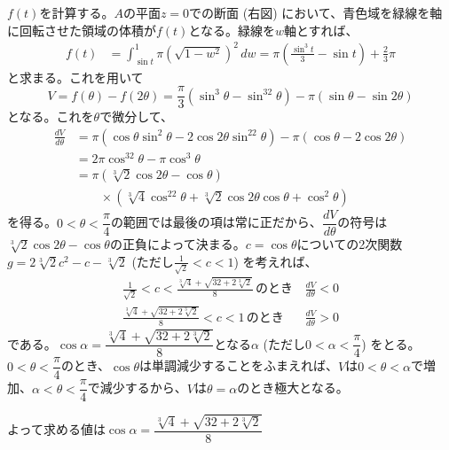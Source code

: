 $f(t)$を計算する。$A$の平面$z=0$での断面 (右図) において、青色域を緑線を軸に回転させた領域の体積が$f(t)$となる。緑線を$w$軸とすれば、
\begin{align*}
 f(t)&=\int_{\sin t}^1\! \pi \left(\sqrt{1-w^2}\right)^2 \,dw = \pi\left(\frac{\sin^3 t}{3}-\sin t\right)+\frac{2}{3}\pi
\end{align*}
と求まる。これを用いて
\[ V=f(\theta)-f(2\theta)=\frac{\pi}{3}(\sin^3\theta-\sin^32\theta)-\pi(\sin \theta-\sin 2\theta) \]
となる。これを$\theta$で微分して、
\begin{align*}
 \frac{dV}{d\theta}&=\pi(\cos\theta\sin^2\theta-2\cos2\theta\sin^22\theta)-\pi(\cos\theta-2\cos2\theta) \\
 &= 2\pi\cos^32\theta-\pi\cos^3\theta \\
 &= \pi(\sqrt[3]{2}\cos2\theta-\cos\theta) \\
 &\qquad \times(\sqrt[3]{4}\cos^22\theta+\sqrt[3]{2}\cos2\theta\cos\theta+\cos^2\theta)
\end{align*}
を得る。$0<\theta<\dfrac{\pi}{4}$の範囲では最後の項は常に正だから、$\dfrac{dV}{d\theta}$の符号は$\sqrt[3]{2}\cos2\theta-\cos\theta$の正負によって決まる。$c=\cos\theta$についての2次関数$g=2\sqrt[3]{2}c^2-c-\sqrt[3]{2}$ (ただし$\frac{1}{\sqrt{2}}<c<1$) を考えれば、
\begin{align*}
 \frac{1}{\sqrt{2}}<c<\frac{\sqrt[3]{4}+\sqrt{32+2\sqrt[3]{2}}}{8}\,\text{のとき}\,&\frac{dV}{d\theta}<0 \\
 \frac{\sqrt[3]{4}+\sqrt{32+2\sqrt[3]{2}}}{8}<c<1\,\text{のとき}\,&\frac{dV}{d\theta}>0
\end{align*}
である。$\cos\alpha=\dfrac{\sqrt[3]{4}+\sqrt{32+2\sqrt[3]{2}}}{8}$となる$\alpha$ (ただし$0<\alpha<\dfrac{\pi}{4}$) をとる。$0<\theta<\dfrac{\pi}{4}$のとき、$\cos\theta$は単調減少することをふまえれば、$V$は$0<\theta<\alpha$で増加、$\alpha<\theta<\dfrac{\pi}{4}$で減少するから、$V$は$\theta=\alpha$のとき極大となる。

よって求める値は$\cos\alpha=\dfrac{\sqrt[3]{4}+\sqrt{32+2\sqrt[3]{2}}}{8}$